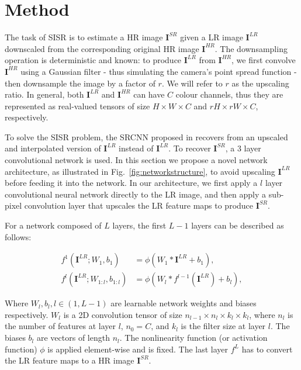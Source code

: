 \documentclass[10pt,twocolumn,letterpaper]{article}
\newcommand{\lrimage}[0]{\mathbf{I}^{LR}}
\newcommand{\hrimage}[0]{\mathbf{I}^{HR}}
\newcommand{\networkoutput}[0]{\mathbf{I}^{SR}}
\newcommand{\convolution}[2]{#1\ast#2}
\newcommand{\nonlinearity}[0]{\phi}
\begin{document}
\section{Method}

The task of \ac{SISR} is to estimate a \ac{HR} image $\networkoutput$ given a \ac{LR} image $\lrimage$ downscaled from the corresponding original \ac{HR} image $\hrimage$. The downsampling operation is deterministic and known: to produce $\lrimage$ from $\hrimage$, we first convolve $\hrimage$ using a Gaussian filter - thus simulating the camera's point spread function - then downsample the image by a factor of $r$. We will refer to $r$ as the upscaling ratio. In general, both $\lrimage$ and $\hrimage$ can have $C$ colour channels, thus they are represented as real-valued tensors of size $H\times W \times C$ and $rH \times rW \times C$, respectively.

To solve the \ac{SISR} problem, the SRCNN proposed in \cite{dong2015image} recovers from an upscaled and interpolated version of $\lrimage$ instead of $\lrimage$. To recover $\networkoutput$, a 3 layer convolutional network is used. In this section we propose a novel network architecture, as illustrated in Fig.~\ref{fig:networkstructure}, to avoid upscaling $\lrimage$ before feeding it into the network. In our architecture, we first apply a $l$ layer convolutional neural network directly to the \ac{LR} image, and then apply a sub-pixel convolution layer that upscales the \ac{LR} feature maps to produce $\networkoutput$.

For a network composed of $L$ layers, the first $L-1$ layers can be described as follows:

\begin{align}
	f^{1}(\lrimage; W_1, b_1) &= \nonlinearity\left( \convolution{W_1}{\lrimage} + b_1 \right),\\
	f^{l}(\lrimage; W_{1:l},b_{1:l}) &= \nonlinearity\left( \convolution{W_{l}}{f^{l-1}\left(\lrimage\right)}+ b_{l} \right),
\end{align}

Where $W_l, b_l, l \in (1, L-1)$ are learnable network weights and biases respectively. $W_l$ is a 2D convolution tensor of size $n_{l-1} \times n_{l} \times k_l \times k_l$, where $n_{l}$ is the number of features at layer $l$, $n_0 = C$, and $k_l$ is the filter size at layer $l$. The biases $b_l$ are vectors of length $n_l$. The nonlinearity function (or activation function) $\nonlinearity$ is applied element-wise and is fixed. The last layer $f^L$ has to convert the \ac{LR} feature maps to a \ac{HR} image $\networkoutput$.
\end{document}
